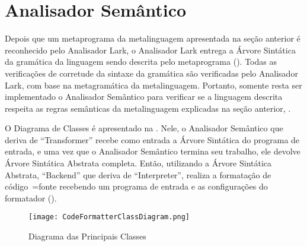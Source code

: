 \section{Analisador Semântico}

Depois que um metaprograma da metalinguagem apresentada na seção anterior é reconhecido pelo Analisador Lark,
o Analisador Lark entrega a Árvore Sintática da gramática da linguagem sendo descrita pelo metaprograma ().
Todas as verificações de corretude da sintaxe da gramática são verificadas pelo Analisador Lark,
com base na metagramática da metalinguagem.
Portanto,
somente resta ser implementado o Analisador Semântico para verificar se a linguagem descrita respeita as regras semânticas da metalinguagem explicadas na seção anterior,
.

O Diagrama de Classes é apresentado na .
Nele,
o Analisador Semântico que deriva de ``Transformer'' recebe como entrada a Árvore Sintática do programa de entrada,
e uma vez que o Analisador Semântico termina seu trabalho,
ele devolve Árvore Sintática Abstrata completa.
Então,
utilizando a Árvore Sintática Abstrata,
``Backend'' que deriva de ``Interpreter'',
realiza a formatação de código~=fonte recebendo um programa de entrada e
as configurações do formatador ().
\begin{figure}[!htb]
\caption{Diagrama das Principais Classes}
\label{CodeFormatterClassDiagram}
\centering
\texttt{[image: CodeFormatterClassDiagram.png]}
\end{figure}

